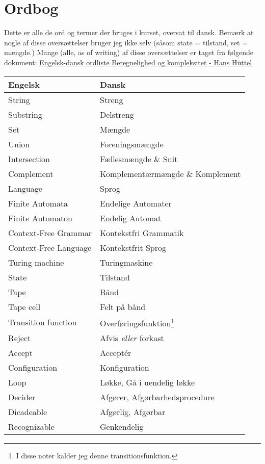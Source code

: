 \chapter{Ordbog}

Dette er alle de ord og termer der bruges i kurset, oversat til dansk. Bemærk at nogle af disse oversættelser bruger jeg ikke selv (såsom state = tilstand, set = mængde.) Mange (alle, as of writing) af disse oversættelser er taget fra følgende dokument: \href{https://homes.cs.aau.dk/~hans/Dat3/BK/pdf/dk/materiale/ordliste.pdf}{Engelsk-dansk ordliste Beregnelighed og kompleksitet - Hans Hüttel}

\begin{longtable}[c]{ll}
  \textbf{Engelsk} & \textbf{Dansk} \\ \hline \endfirsthead \endhead
  String & Streng \\
  Substring & Delstreng \\
  Set & Mængde \\
  Union & Foreningsmængde \\
  Intersection & Fællesmængde \& Snit \\
  Complement & Komplementærmængde \& Komplement \\
  Language & Sprog \\
  Finite Automata & Endelige Automater \\
  Finite Automaton & Endelig Automat \\
  Context-Free Grammar & Kontekstfri Grammatik \\
  Context-Free Language & Kontekstfrit Sprog \\
  Turing machine & Turingmaskine \\
  State & Tilstand \\
  Tape & Bånd \\
  Tape cell & Felt på bånd \\
  Transition function & Overføringsfunktion\footnote{I disse noter kalder jeg denne transitionsfunktion.}\\
  Reject & Afvis \textit{eller} forkast \\
  Accept & Acceptér \\
  Configuration & Konfiguration \\
  Loop & Løkke, Gå i uendelig løkke \\
  Decider & Afgører, Afgørbarhedsprocedure\\
  Dicadeable & Afgørlig, Afgørbar \\
  Recognizable & Genkendelig \\

\end{longtable}

